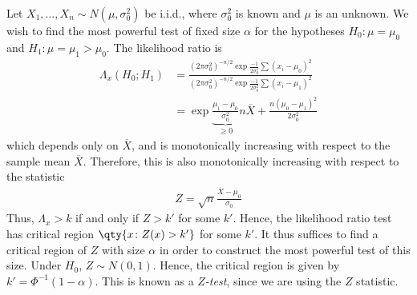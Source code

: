 \begin{example}
	Let $X_1, \dots, X_n \sim N(\mu, \sigma_0^2)$ be i.i.d., where $\sigma_0^2$ is known and $\mu$ is an unknown.
	We wish to find the most powerful test of fixed size $\alpha$ for the hypotheses $H_0 \colon \mu = \mu_0$ and $H_1 \colon \mu = \mu_1 > \mu_0$.
	The likelihood ratio is
	\begin{align*}
		\Lambda_x(H_0;H_1) & = \frac{(2\pi \sigma_0^2)^{-n/2} \exp{\frac{-1}{2\sigma_0^2} \sum (x_i - \mu_0)^2}}{(2\pi \sigma_0^2)^{-n/2} \exp{\frac{-1}{2\sigma_0^2} \sum (x_i - \mu_1)^2}} \\
		                   & = \exp{\underbrace{\frac{\mu_1 - \mu_0}{\sigma_0^2}}_{\geq 0} n \overline X + \frac{n(\mu_0 - \mu_1)^2}{2\sigma_0^2}}
	\end{align*}
	which depends only on $\overline X$, and is monotonically increasing with respect to the sample mean $\overline X$.
	Therefore, this is also monotonically increasing with respect to the statistic
	\begin{align*}
		Z = \sqrt{n}\frac{\overline X - \mu_0}{\sigma_0}
	\end{align*}
	Thus, $\Lambda_x > k$ if and only if $Z > k'$ for some $k'$.
	Hence, the likelihood ratio test has critical region $\qty{x\colon Z(x) > k'}$ for some $k'$.
	It thus suffices to find a critical region of $Z$ with size $\alpha$ in order to construct the most powerful test of this size.
	Under $H_0$, $Z \sim N(0,1)$.
	Hence, the critical region is given by $k' = \Phi^{-1}(1-\alpha)$.
	This is known as a \textit{$Z$-test}, since we are using the $Z$ statistic.
\end{example}

